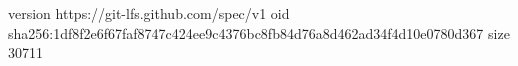 version https://git-lfs.github.com/spec/v1
oid sha256:1df8f2e6f67faf8747c424ee9c4376bc8fb84d76a8d462ad34f4d10e0780d367
size 30711
